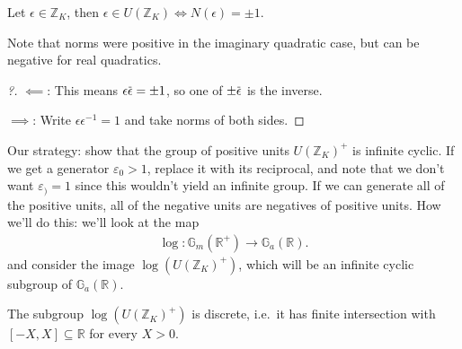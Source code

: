\begin{lemma}[?]

Let \(\epsilon\in {\mathbb{Z}}_K\), then
\(\epsilon \in U({\mathbb{Z}}_K) \iff N( \epsilon) = \pm 1\).

\end{lemma}

\begin{remark}

Note that norms were positive in the imaginary quadratic case, but can
be negative for real quadratics.

\end{remark}

\begin{proof}[?]

\(\impliedby\): This means
\(\epsilon \mkern 1.5mu\overline{\mkern-1.5mu \epsilon \mkern-1.5mu}\mkern 1.5mu = \pm 1\),
so one of
\(\pm \mkern 1.5mu\overline{\mkern-1.5mu\epsilon\mkern-1.5mu}\mkern 1.5mu\)
is the inverse.

\(\implies\): Write \(\epsilon \epsilon ^{-1} = 1\) and take norms of
both sides.

\end{proof}

\begin{remark}

Our strategy: show that the group of positive units
\(U({\mathbb{Z}}_K)^+\) is infinite cyclic. If we get a generator
\(\varepsilon_0 > 1\), replace it with its reciprocal, and note that we
don't want \(\varepsilon_) = 1\) since this wouldn't yield an infinite
group. If we can generate all of the positive units, all of the negative
units are negatives of positive units. How we'll do this: we'll look at
the map
\begin{align*}
\log: {\mathbb{G}}_m({\mathbb{R}}^+) \xrightarrow{} {\mathbb{G}}_a({\mathbb{R}})
.\end{align*}
and consider the image \(\log( U( {\mathbb{Z}}_K)^+)\), which will be an
infinite cyclic subgroup of \({\mathbb{G}}_a({\mathbb{R}})\).

\end{remark}

\begin{proposition}[?]

The subgroup \(\log( U ({\mathbb{Z}}_K)^+ )\) is discrete, i.e.~it has
finite intersection with \([-X, X] \subseteq {\mathbb{R}}\) for every
\(X>0\).

\end{proposition}

